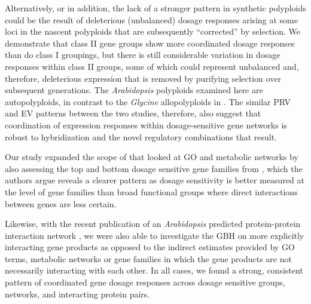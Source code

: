 \documentclass[11pt]{article}
\begin{document}
Alternatively, or in addition, the lack of a stronger pattern in synthetic polyploids could be the result of deleterious (unbalanced) dosage responses arising at some loci in the nascent polyploids that are subsequently ``corrected'' by selection. We demonstrate that class II gene groups show more coordinated dosage responses than do class I groupings, but there is still considerable variation in dosage responses within class II groups, some of which could represent unbalanced and, therefore, deleterious expression that is removed by purifying selection over subsequent generations. 
The {\it Arabidopsis} polyploids examined here are autopolyploids, in contrast to the {\it Glycine} allopolyploids in \cite{coate2016}. The similar PRV and EV patterns between the two studies, therefore, also suggest that coordination of expression responses within dosage-sensitive gene networks is robust to hybridization and the novel regulatory combinations that result.

Our study expanded the scope of \cite{coate2016} that looked at GO and metabolic networks by also assessing the top and bottom dosage sensitive gene families from \cite{tasdighian2017}, which the authors argue reveals a clearer pattern as dosage sensitivity is better measured at the level of gene families than broad functional groups where direct interactions between genes are less certain. 

Likewise, with the recent publication of an {\it Arabidopsis} predicted protein-protein interaction network \citep{dong2019}, we were also able to investigate the GBH on more explicitly interacting gene products as opposed to the indirect estimates provided by GO terms, metabolic networks or gene families  in which the gene products are not necessarily interacting with each other. In all cases, we found a strong, consistent pattern of coordinated gene dosage responses across dosage sensitive groups, networks, and interacting protein pairs.
\end{document}
